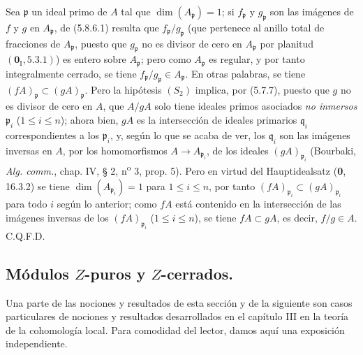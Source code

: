 Sea $\mathfrak p$ un ideal primo de $A$ tal que
$\dim(A_{\mathfrak p})=1$; si $f_{\mathfrak p}$ y $g_{\mathfrak p}$ son las
imágenes de $f$ y $g$ en $A_{\mathfrak p}$, de (5.8.6.1) resulta que
$f_{\mathfrak p}/g_{\mathfrak p}$ (que pertenece al anillo total de
fracciones de $A_{\mathfrak p}$, puesto que $g_{\mathfrak p}$ no es divisor
de cero en $A_{\mathfrak p}$ por planitud $(\mathbf{0}_{\mathrm I},5.3.1)$) es entero
sobre $A_{\mathfrak p}$; pero como $A_{\mathfrak p}$ es regular, y por tanto
integralmente cerrado, se tiene
$f_{\mathfrak p}/g_{\mathfrak p}\in A_{\mathfrak p}$. En otras palabras, se
tiene $(fA)_{\mathfrak p}\subset(gA)_{\mathfrak p}$. Pero la hipótesis
$(S_2)$ implica, por (5.7.7), puesto que $g$ no es divisor de cero en $A$, que
$A/gA$ solo tiene ideales primos asociados \emph{no inmersos} $\mathfrak p_i$
($1\leq i\leq n$); ahora bien, $gA$ es la intersección de ideales primarios
$\mathfrak q_i$ correspondientes a los $\mathfrak p_i$, y, según lo que
se acaba de ver, los $\mathfrak q_i$ son las imágenes inversas en $A$, por los
homomorfismos $A\to A_{\mathfrak p_i}$, de los ideales
$(gA)_{\mathfrak p_i}$ (Bourbaki, \emph{Alg. comm.}, chap. IV, § 2, n\textsuperscript{o} 3,
prop. 5). Pero en virtud del Hauptidealsatz (\textbf 0, 16.3.2) se tiene
$\dim(A_{\mathfrak p_i})=1$ para $1\leq i\leq n$, por tanto
$(fA)_{\mathfrak p_i}\subset(gA)_{\mathfrak p_i}$ para todo $i$ según lo
anterior; como $fA$ está contenido en la intersección de las imágenes inversas
de los $(fA)_{\mathfrak p_i}$ ($1\leq i\leq n$), se tiene $fA\subset gA$, es
decir, $f/g\in A$. C.Q.F.D.


\subsection{\texorpdfstring{Módulos $Z$-puros y $Z$-cerrados.}{Módulos Z-puros y Z-cerrados}}

Una parte de las nociones y resultados de esta sección y de la siguiente son
casos particulares de nociones y resultados desarrollados en el capítulo III
en la teoría de la cohomología local. Para comodidad del lector, damos aquí
una exposición independiente.
